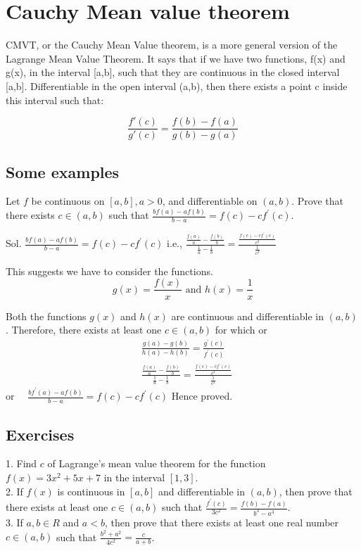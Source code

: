 \section{Cauchy Mean value theorem}

CMVT, or the Cauchy Mean Value theorem, is a more general version of the Lagrange Mean Value Theorem. It says that if we have two functions, f(x) and g(x), in the interval [a,b], such that they are continuous in the closed interval [a,b]. Differentiable in the open interval (a,b), then there exists a point c inside this interval such that:

$$\frac{f'(c)}{g'(c)}=\frac{f(b)-f(a)}{g(b)-g(a)}$$

\subsection{Some examples}

Let $f$ be continuous on $[a, b], a>0$, and differentiable on $(a, b)$. Prove that there exists $c \in(a, b)$ such that $\frac{b f(a)-a f(b)}{b-a}=f(c)-c f^{\prime}(c)$.

\begin{outline}
Sol. $\frac{b f(a)-a f(b)}{b-a}=f(c)-c f^{\prime}(c)$ i.e., $\frac{\frac{f(a)}{a}-\frac{f(b)}{b}}{\frac{1}{a}-\frac{1}{b}}=\frac{\frac{f(c)-c f^{\prime}(c)}{c^2}}{\frac{1}{c^2}}$

This suggests we have to consider the functions.
$$
g(x)=\frac{f(x)}{x} \text { and } h(x)=\frac{1}{x}
$$

Both the functions $g(x)$ and $h(x)$ are continuous and differentiable in $(a, b)$.
Therefore, there exists at least one $c \in(a, b)$ for which or
$$
\begin{aligned}
& \frac{g(a)-g(b)}{h(a)-h(b)}=\frac{g^{\prime}(c)}{f^{\prime}(c)} \\
& \frac{\frac{f(a)}{a}-\frac{f(b)}{b}}{\frac{1}{a}-\frac{1}{b}}=\frac{\frac{f(c)-c f^{\prime}(c)}{c^2}}{\frac{1}{c^2}}
\end{aligned}
$$
or $\quad \frac{b f^{\prime}(a)-a f(b)}{b-a}=f(c)-c f^{\prime}(c)$
Hence proved.
\end{outline}


\subsection{Exercises}

1. Find $c$ of Lagrange's mean value theorem for the function $f(x)=3 x^2+5 x+7$ in the interval $[1,3]$.\\
2. If $f(x)$ is continuous in $[a, b]$ and differentiable in $(a, b)$, then prove that there exists at least one $c \in(a, b)$ such that $\frac{f^{\prime}(c)}{3 c^2}=\frac{f(b)-f(a)}{b^3-a^3}$.\\
3. If $a, b \in R$ and $a<b$, then prove that there exists at least one real number $c \in(a, b)$ such that $\frac{b^2+a^2}{4 c^2}=\frac{c}{a+b}$.\\

